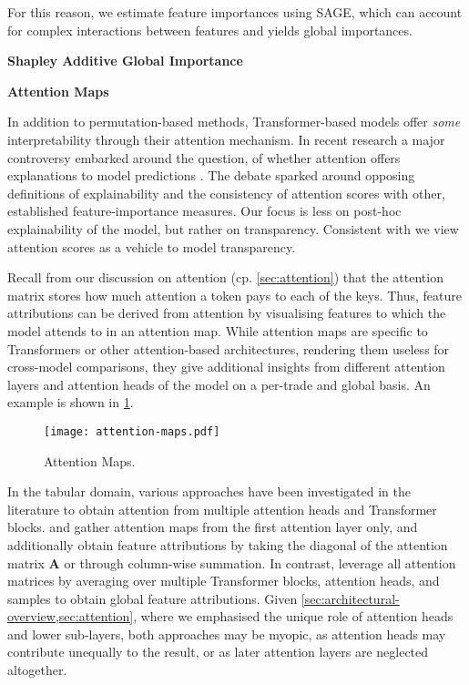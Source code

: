 For this reason, we estimate feature importances using \gls{SAGE}, which can account for complex interactions between features and yields global importances. 

\textbf{Shapley Additive Global Importance}


\textbf{Attention Maps}

In addition to permutation-based methods, Transformer-based models offer \emph{some} interpretability through their attention mechanism. In recent research a major controversy embarked around the question, of whether attention offers explanations to model predictions \autocites[cp.][150]{bastingsElephantInterpretabilityRoom2020}[][5--7]{jainAttentionNotExplanation2019}[][9]{wiegreffeAttentionNotNot2019}. The debate sparked around opposing definitions of explainability and the consistency of attention scores with other, established feature-importance measures. Our focus is less on post-hoc explainability of the model, but rather on transparency. Consistent with \textcite[][8]{wiegreffeAttentionNotNot2019} we view attention scores as a vehicle to model transparency.

Recall from our discussion on attention (cp. \cref{sec:attention}) that the attention matrix stores how much attention a token pays to each of the keys. Thus, feature attributions can be derived from attention by visualising features to which the model attends to in an attention map. While attention maps are specific to Transformers or other attention-based architectures, rendering them useless for cross-model comparisons, they give additional insights from different attention layers and attention heads of the model on a per-trade and global basis. An example is shown in \cref{fig:attention-maps}.

\begin{figure}[ht]
    \centering
    \texttt{[image: attention-maps.pdf]}
    \caption[Attention Maps]{Attention Maps.}
    \label{fig:attention-maps}
\end{figure}

In the tabular domain, various approaches have been investigated in the literature to obtain attention from multiple attention heads and Transformer blocks. \textcite[][18]{somepalliSaintImprovedNeural2021} and \textcite[][11]{borisovDeepNeuralNetworks2022} gather attention maps from the first attention layer only, and \textcite[][11]{borisovDeepNeuralNetworks2022} additionally obtain feature attributions by taking the diagonal of the attention matrix $\mathbf{A}$ or through column-wise summation. In contrast, \textcite[][10]{gorishniyRevisitingDeepLearning2021} leverage all attention matrices by averaging over multiple Transformer blocks, attention heads, and samples to obtain global feature attributions. Given \cref{sec:architectural-overview,sec:attention}, where we emphasised the unique role of attention heads and lower sub-layers, both approaches may be myopic, as attention heads may contribute unequally to the result, or as later attention layers are neglected altogether.

